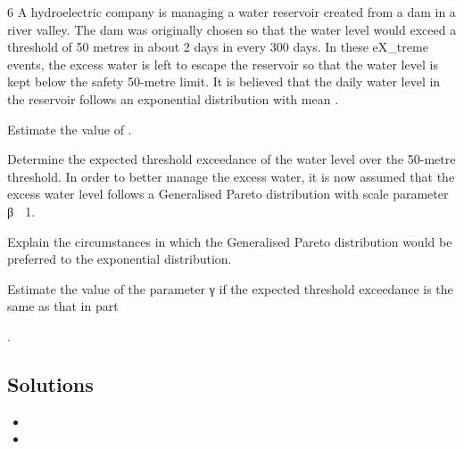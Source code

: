 \documentclass[a4paper,12pt]{article}
\begin{document}


6 A hydroelectric company is managing a water reservoir created from a dam in a river
valley. The dam was originally chosen so that the water level would exceed a
threshold of 50 metres in about 2 days in every 300 days. In these eX_{t}reme events, the
excess water is left to escape the reservoir so that the water level is kept below the
safety 50-metre limit.
It is believed that the daily water level in the reservoir follows an exponential
distribution with mean \mu.
\item   Estimate the value of \mu. 
\item   Determine the expected threshold exceedance of the water level over the
50-metre threshold. 
In order to better manage the excess water, it is now assumed that the excess water
level follows a Generalised Pareto distribution with scale parameter β 􀵌 1.
\item  Explain the circumstances in which the Generalised Pareto distribution would
be preferred to the exponential distribution. 
\item  Estimate the value of the parameter γ if the expected threshold exceedance is
the same as that in part \item  . 

\subsection*{Solutions}

\begin{itemize}
\item
\item
\end{itemize}
\end{document}
